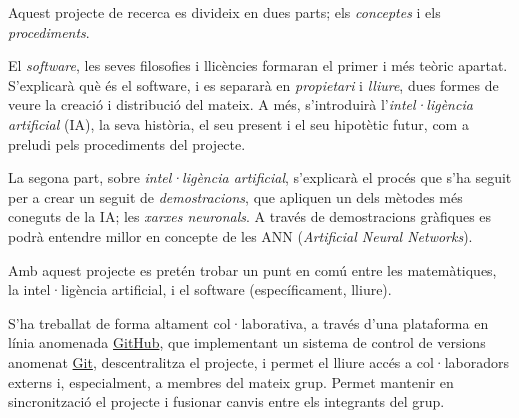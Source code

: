 Aquest projecte de recerca es divideix en dues parts; els \emph{conceptes}
i els \emph{procediments}.

El \emph{software}, les seves filosofies i llicències formaran el primer i més
teòric apartat. S'explicarà què és el software, i es separarà en \emph{propietari}
i \emph{lliure}, dues formes de veure la creació i distribució del mateix. A més,
s'introduirà l'\emph{intel·ligència artificial} (IA), la seva història, el seu present i el
seu hipotètic futur, com a preludi pels procediments del projecte.

La segona part, sobre \emph{intel·ligència artificial}, s'explicarà el procés
que s'ha seguit per a crear un seguit de \emph{demostracions}, que apliquen un
dels mètodes més coneguts de la IA; les \emph{xarxes neuronals}. A través de demostracions
gràfiques es podrà entendre millor en concepte de les ANN (\emph{Artificial Neural Networks}).

Amb aquest projecte es pretén trobar un punt en comú entre les matemàtiques,
la intel·ligència artificial, i el software (específicament, lliure).

S'ha treballat de forma altament col·laborativa, a través d'una plataforma
en línia anomenada \href{http://github.com}{GitHub}, que implementant un sistema
de control de versions anomenat \href{http://git-scm.com/}{Git}, descentralitza
el projecte, i permet el lliure accés a col·laboradors externs i, especialment, a membres
del mateix grup. Permet mantenir en sincronització el projecte i fusionar canvis entre els integrants del grup.